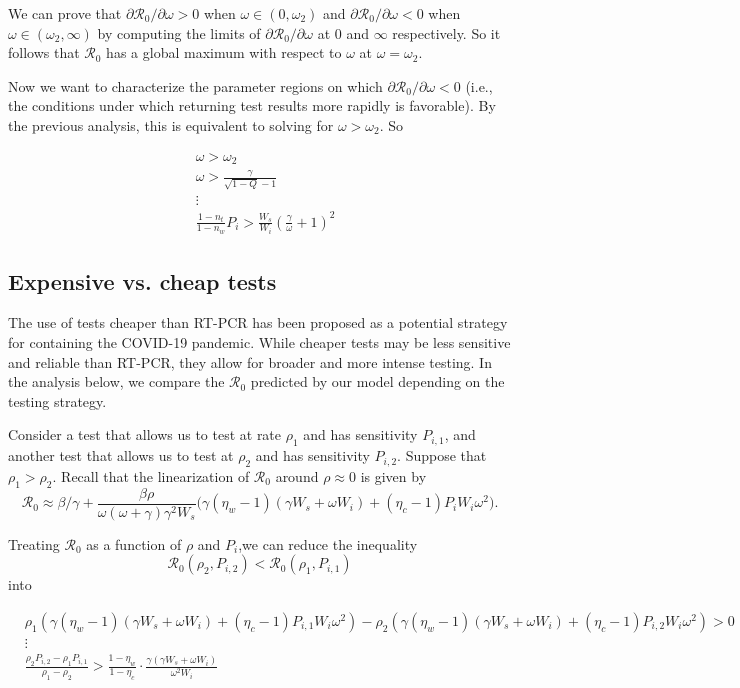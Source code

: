 \documentclass[12pt]{article}
\newcommand{\Rnum}{\mathcal{R}_0}
\theoremstyle{definition} %
\begin{document}
We can prove that $\partial{\Rnum}/\partial{\omega} > 0$ when $\omega \in (0,\omega_2)$ and $\partial{\Rnum}/\partial{\omega} < 0$ when $\omega \in (\omega_2,\infty)$ by computing the limits of $\partial{\Rnum}/\partial{\omega}$ at $0$ and $\infty$ respectively. So it follows that $\Rnum$ has a global maximum with respect to $\omega$ at $\omega = \omega_2$.

Now we want to characterize the parameter regions on which $\partial{\Rnum}/\partial{\omega} < 0$ (i.e., the conditions under which returning test results more rapidly is favorable). By the previous analysis, this is equivalent to solving for $\omega > \omega_2$. So

\begin{align}\label{eq:necsuf}
    &\omega > \omega_2 \nonumber \\
    &\omega > \frac{\gamma}{\sqrt{1-Q}-1} \nonumber \\
    &\vdots \nonumber \\
    &\frac{1-n_{t}}{1-n_{w}}P_{i}>\frac{W_{s}}{W_{i}}\left(\frac{\gamma}{\omega}+1\right)^{2}
\end{align}


\subsection{Expensive vs. cheap tests}

The use of tests cheaper than RT-PCR has been proposed as a potential strategy for containing the COVID-19 pandemic. While cheaper tests may be less sensitive and reliable than RT-PCR, they allow for broader and more intense testing. In the analysis below, we compare the $\Rnum$ predicted by our model depending on the testing strategy. 

Consider a test that allows us to test at rate $\rho_1$ and has sensitivity $P_{i,1}$, and another test that allows us to test at $\rho_2$ and has sensitivity $P_{i,2}$. Suppose that $\rho_1 > \rho_2$. Recall that the linearization of $\Rnum$ around $\rho \approx 0$ is given by $$\Rnum \approx \beta/\gamma + \frac{\beta \rho}{\omega (\omega+\gamma) \gamma^2 W_s} \Big(\gamma(\eta_w-1)(\gamma W_s+\omega W_i) + (\eta_c -1)P_iW_i \omega^2 \Big).$$


Treating $\Rnum$ as a function of $\rho$ and $P_i$,we can reduce the inequality $$\Rnum(\rho_2, P_{i,2}) < \Rnum(\rho_1, P_{i,1})$$ into 

\begin{align}\label{eq:rho1vsrho2}
    &\rho_1\left(\gamma(\eta_w-1)(\gamma W_s + \omega W_i) + (\eta_c-1)P_{i, 1}W_i\omega^2\right) - \rho_2\left(\gamma(\eta_w-1)(\gamma W_s + \omega W_i) + (\eta_c-1)P_{i, 2}W_i\omega^2\right) > 0 \nonumber \\
    &\vdots \nonumber \\
    &\frac{\rho_2P_{i, 2}-\rho_1P_{i, 1} }{\rho_1-\rho_2} > \frac{1-\eta_w}{1-\eta_c}\cdot \frac{\gamma(\gamma W_s + \omega W_i)}{\omega^2 W_i}
\end{align}
\end{document}

